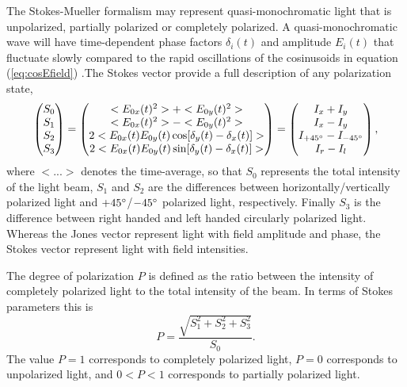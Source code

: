 The Stokes-Mueller formalism may represent quasi-monochromatic light that is unpolarized, partially polarized or completely polarized. A quasi-monochromatic wave will have time-dependent phase factors $\delta_i(t)$ and amplitude $E_i(t)$ that fluctuate slowly compared to the rapid oscillations of the cosinusoids in equation (\ref{eq:cosEfield}) \cite{collett}.The Stokes vector provide a full description of any polarization state\cite{azzam},
\begin{equation}
    \begin{pmatrix}
        S_0 \\
        S_1 \\
        S_2 \\
        S_3
    \end{pmatrix}
    =
    \begin{pmatrix}
        <E_{0x}(t)^2> + <E_{0y}(t)^2> \\
        <E_{0x}(t)^2> - <E_{0y}(t)^2> \\
        2<E_{0x}(t)E_{0y}(t)\cos[\delta_y(t) - \delta_x(t)]> \\
        2<E_{0x}(t)E_{0y}(t)\sin[\delta_y(t) - \delta_x(t)]>
    \end{pmatrix}
    =
    \begin{pmatrix}
        I_x + I_y \\
        I_x - I_y \\
        I_{+45\degree} - I_{-45\degree} \\
        I_r - I_l
    \end{pmatrix},
    \label{eq:StokesVector}
\end{equation}
where $<...>$ denotes the time-average, so that $S_0$ represents the total intensity of the light beam, $S_1$ and $S_2$ are the differences between horizontally/vertically polarized light and $+45\degree$/$-45\degree$ polarized light, respectively. Finally $S_3$ is the difference between right handed and left handed circularly polarized light.
Whereas the Jones vector represent light with field amplitude and phase, the Stokes vector represent light with field intensities. %

The degree of polarization $P$ is defined as the ratio between the intensity of completely polarized light to the total intensity of the beam. In terms of Stokes parameters this is 
\begin{equation}
    P = \frac{\sqrt{S_1^2 + S_2^2 + S_3^2}}{S_0}.
\end{equation}
The value $P=1$ corresponds to completely polarized light, $P=0$ corresponds to unpolarized light, and $0<P<1$ corresponds to partially polarized light.

